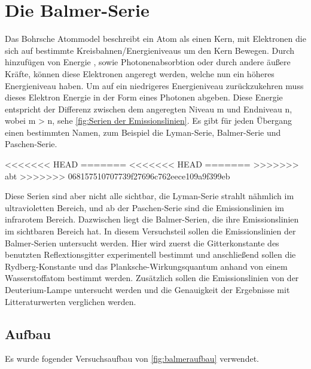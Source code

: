 \chapter{Die Balmer-Serie}

Das Bohrsche Atommodel beschreibt ein Atom als einen Kern, mit Elektronen die sich auf bestimmte Kreisbahnen/Energieniveaus um den Kern Bewegen.
Durch hinzufügen von Energie , sowie Photonenabsorbtion oder durch andere äußere Kräfte, können diese Elektronen angeregt werden, welche nun ein höheres Energieniveau haben. 
Um auf ein niedrigeres Energieniveau zurückzukehren muss dieses Elektron Energie in der Form eines Photonen abgeben. 
Diese Energie entspricht der Differenz zwischen dem angeregten Niveau m und Endniveau n, wobei m > n, sehe \cref{fig:Serien der Emissionslinien}. 
Es gibt für jeden Übergang einen bestimmten Namen, zum Beispiel die Lyman-Serie, Balmer-Serie und Paschen-Serie.

<<<<<<< HEAD
=======
<<<<<<< HEAD
=======
>>>>>>> abt
>>>>>>> 068157510707739f27696c762eece109a9f399eb

Diese Serien sind aber nicht alle sichtbar, die Lyman-Serie strahlt nähmlich im ultravioletten Bereich, und ab der Paschen-Serie sind die Emissionslinien im infrarotem Bereich.
Dazwischen liegt die Balmer-Serien, die ihre Emissionslinien im sichtbaren Bereich hat.
In diesem Versuchsteil sollen die Emissionslinien der Balmer-Serien untersucht werden. 
Hier wird zuerst die Gitterkonstante des benutzten Reflextionsgitter experimentell bestimmt und anschließend sollen die Rydberg-Konstante und das Planksche-Wirkungsquantum anhand von einem Wasserstoffatom bestimmt werden.
Zusätzlich sollen die Emissionslinien von der Deuterium-Lampe untersucht werden und die Genauigkeit der Ergebnisse mit Litteraturwerten verglichen werden.


\section{Aufbau}

Es wurde fogender Versuchsaufbau von \cref{fig:balmeraufbau} verwendet. 

